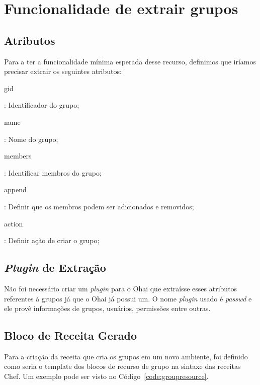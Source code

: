 \section{Funcionalidade de extrair grupos}
\label{sec:groups}

\subsection{Atributos}

Para a ter a funcionalidade mínima esperada desse recurso, definimos que iríamos precisar
extrair os seguintes atributos:

\begin{itemize}
    {\itshape\item gid}: Identificador do grupo;
    {\itshape\item name}: Nome do grupo;
    {\itshape\item members}: Identificar membros do grupo;
\end{itemize}


\begin{itemize}
    {\itshape\item append}: Definir que os membros podem ser adicionados e removidos;
    {\itshape\item action}: Definir ação de criar o grupo;
\end{itemize}

\subsection{\textit{Plugin} de Extração}
Não foi necessário criar um \textit{plugin} para o Ohai que extraísse esses atributos
referentes à grupos já que o Ohai já possui um. O nome \textit{plugin} usado é 
\textit{passwd} e ele provê informações de grupos, usuários, permissões entre outras.

\subsection{Bloco de Receita Gerado}

Para a criação da receita que cria os grupos em um novo ambiente, foi definido
como seria o template dos blocos de recurso de grupo na sintaxe das receitas Chef.
Um exemplo pode ser visto no Código~\ref{code:groupresource}.

\noindent\begin{minipage}{\textwidth}
  \lstset{style=shell}
  
\end{minipage}\hfill

